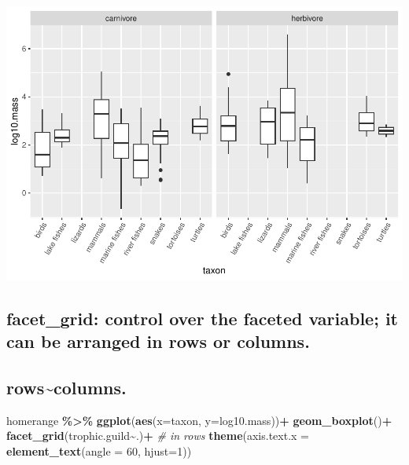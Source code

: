 \documentclass[
]{article}
\newenvironment{Shaded}{\begin{snugshade}}{\end{snugshade}}
\newcommand{\AttributeTok}[1]{\textcolor[rgb]{0.13,0.29,0.53}{#1}}
\newcommand{\CommentTok}[1]{\textcolor[rgb]{0.56,0.35,0.01}{\textit{#1}}}
\newcommand{\DecValTok}[1]{\textcolor[rgb]{0.00,0.00,0.81}{#1}}
\newcommand{\FunctionTok}[1]{\textcolor[rgb]{0.13,0.29,0.53}{\textbf{#1}}}
\newcommand{\NormalTok}[1]{#1}
\newcommand{\SpecialCharTok}[1]{\textcolor[rgb]{0.81,0.36,0.00}{\textbf{#1}}}
\begin{document}
\includegraphics{Untitled_files/figure-latex/unnamed-chunk-44-1.pdf}

\hypertarget{facet_grid-control-over-the-faceted-variable-it-can-be-arranged-in-rows-or-columns.}{%
\subsection{facet\_grid: control over the faceted variable; it can be
arranged in rows or
columns.}\label{facet_grid-control-over-the-faceted-variable-it-can-be-arranged-in-rows-or-columns.}}

\hypertarget{rowscolumns.}{%
\subsection{rows\textasciitilde columns.}\label{rowscolumns.}}

\begin{Shaded}
\begin{Highlighting}[]
\NormalTok{homerange }\SpecialCharTok{\%\textgreater{}\%} 
  \FunctionTok{ggplot}\NormalTok{(}\FunctionTok{aes}\NormalTok{(}\AttributeTok{x=}\NormalTok{taxon, }\AttributeTok{y=}\NormalTok{log10.mass))}\SpecialCharTok{+}
  \FunctionTok{geom\_boxplot}\NormalTok{()}\SpecialCharTok{+}
  \FunctionTok{facet\_grid}\NormalTok{(trophic.guild}\SpecialCharTok{\textasciitilde{}}\NormalTok{.)}\SpecialCharTok{+} \CommentTok{\# in rows}
  \FunctionTok{theme}\NormalTok{(}\AttributeTok{axis.text.x =} \FunctionTok{element\_text}\NormalTok{(}\AttributeTok{angle =} \DecValTok{60}\NormalTok{, }\AttributeTok{hjust=}\DecValTok{1}\NormalTok{))}
\end{Highlighting}
\end{Shaded}
\end{document}
